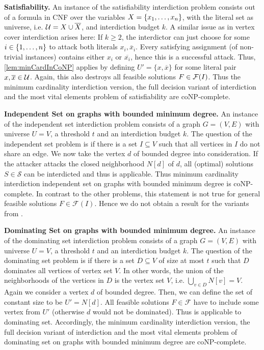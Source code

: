 \textbf{Satisfiability.}
An instance of the satisfiability interdiction problem consists out of a formula in CNF over the variables $X = \{ x_1, \ldots, x_n \}$, with the literal set as universe, i.e. $\mathcal{U} = X \cup \overline X$, and interdiction budget $k$.
A similar issue as in vertex cover interdiction arises here:
If $k \geq 2$, the interdictor can just choose for some $i \in \{ 1, \ldots, n \}$ to attack both literals $x_i, \overline x_i$.
Every satisfying assignment (of non-trivial instances) contains either $x_i$ or $\overline{x_i}$, hence this is a successful attack.
Thus, \cref{lem:minCardInCoNP} applies by defining $U' = \{x, \overline x\}$ for some literal pair $x, \overline x \in \mathcal{U}$.
Again, this also destroys all feasible solutions $F \in \mathcal{F}(I)$.
Thus the minimum cardinality interdiction version, the full decision variant of interdiction and the most vital elements problem of satisfiability are coNP-complete.

\textbf{Independent Set on graphs with bounded minimum degree.}
An instance of the independent set interdiction problem consists of a graph $G =(V,E)$ with universe $U = V$, a threshold $t$ and an interdiction budget $k$.
The question of the independent set  problem is if there is a set $I \subseteq V$ such that all vertices in $I$ do not share an edge.
We now take the vertex $d$ of bounded degree into consideration.
If the attacker attacks the closed neighborhood $N[d]$ of $d$, all (optimal) solutions $S \in \mathcal S$ can be interdicted and thus  is applicable.
Thus minimum cardinality interdiction independent set on graphs with bounded minimum degree is coNP-complete.
In contrast to the other problems, this statement is not true for general feasible solutions $F \in \mathcal F(I)$. Hence we do not obtain a result for the variants from .

\textbf{Dominating Set on graphs with bounded minimum degree.}
An instance of the dominating set interdiction problem consists of a graph $G =(V,E)$ with universe $U = V$, a threshold $t$ and an interdiction budget $k$.
The question of the dominating set problem is if there is a set $D \subseteq V$ of size at most $t$ such that $D$ dominates all vertices of vertex set $V$. In other words, the union of the neighborhoods of the vertices in $D$ is the vertex set $V$, i.e. $\bigcup_{v \in D} N[v] = V$.
Again we consider a vertex $d$ of bounded degree.
Then, we can define the set of constant size to be $U' = N[d]$.
All feasible solutions $F \in \mathcal F$ have to include some vertex from $U'$ (otherwise $d$ would not be dominated).
Thus  is applicable to dominating set.
Accordingly, the minimum cardinality interdiction version, the full decision variant of interdiction and the most vital elements problem of dominating set on graphs with bounded minimum degree are coNP-complete.

